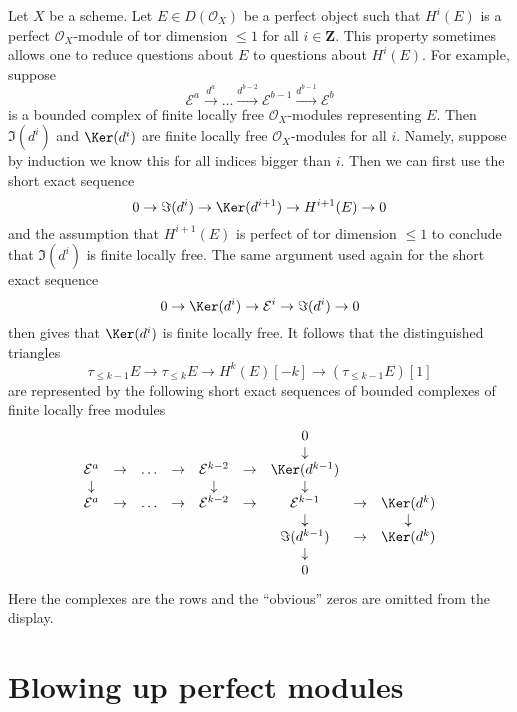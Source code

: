 \begin{remark}
\label{remark-when-you-have-a-complex}
Let $X$ be a scheme. Let $E \in D(\mathcal{O}_X)$ be a perfect object such
that $H^i(E)$ is a perfect $\mathcal{O}_X$-module of tor dimension $\leq 1$
for all $i \in \mathbf{Z}$. This property sometimes allows one to reduce
questions about $E$ to questions about $H^i(E)$. For example, suppose
$$
\mathcal{E}^a \xrightarrow{d^a} \ldots
\xrightarrow{d^{b - 2}} \mathcal{E}^{b - 1}
\xrightarrow{d^{b - 1}} \mathcal{E}^b
$$
is a bounded complex of finite locally free $\mathcal{O}_X$-modules
representing $E$. Then $\Im(d^i)$ and $\Ker(d^i)$ are finite locally
free $\mathcal{O}_X$-modules for all $i$. Namely, suppose by induction
we know this for all indices bigger than $i$. Then we can first use the
short exact sequence
$$
0 \to \Im(d^i) \to \Ker(d^{i + 1}) \to H^{i + 1}(E) \to 0
$$
and the assumption that $H^{i + 1}(E)$ is perfect of tor dimension $\leq 1$
to conclude that $\Im(d^i)$ is finite locally free.
The same argument used again for the short exact sequence
$$
0 \to \Ker(d^i) \to \mathcal{E}^i \to \Im(d^i) \to 0
$$
then gives that $\Ker(d^i)$ is finite locally free.
It follows that the distinguished triangles
$$
\tau_{\leq k - 1}E \to \tau_{\leq k}E \to H^k(E)[-k] \to
(\tau_{\leq k - 1}E)[1]
$$
are represented by the following short exact sequences of
bounded complexes of finite locally free modules
$$
\begin{matrix}
& &
& &
& &
0 \\
& &
& &
& &
\downarrow \\
\mathcal{E}^a & \to &
\ldots & \to &
\mathcal{E}^{k - 2} & \to &
\Ker(d^{k - 1}) \\
\downarrow & &
& &
\downarrow & &
\downarrow \\
\mathcal{E}^a & \to &
\ldots & \to &
\mathcal{E}^{k - 2} & \to &
\mathcal{E}^{k - 1} & \to &
\Ker(d^k) \\
& &
& &
& &
\downarrow & &
\downarrow \\
& &
& &
& &
\Im(d^{k - 1}) & \to &
\Ker(d^k) \\
& &
& &
& &
\downarrow \\
& &
& &
& &
0
\end{matrix}
$$
Here the complexes are the rows and the ``obvious'' zeros
are omitted from the display.
\end{remark}





\section{Blowing up perfect modules}
\label{section-blowup-perfect-modules}

